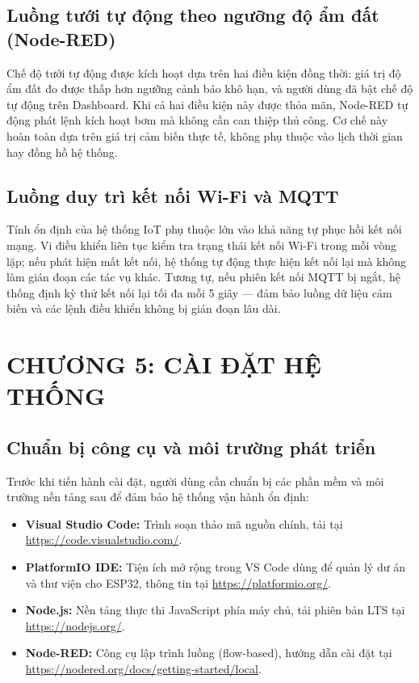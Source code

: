 \documentclass[12pt, a4paper]{article}
\begin{document}
\subsection{Luồng tưới tự động theo ngưỡng độ ẩm đất (Node-RED)}

Chế độ tưới tự động được kích hoạt dựa trên hai điều kiện đồng thời: giá trị độ ẩm đất đo được thấp hơn ngưỡng cảnh báo khô hạn, và người dùng đã bật chế độ tự động trên Dashboard. Khi cả hai điều kiện này được thỏa mãn, Node-RED tự động phát lệnh kích hoạt bơm mà không cần can thiệp thủ công. Cơ chế này hoàn toàn dựa trên giá trị cảm biến thực tế, không phụ thuộc vào lịch thời gian hay đồng hồ hệ thống.

\subsection{Luồng duy trì kết nối Wi-Fi và MQTT}

Tính ổn định của hệ thống IoT phụ thuộc lớn vào khả năng tự phục hồi kết nối mạng. Vi điều khiển liên tục kiểm tra trạng thái kết nối Wi-Fi trong mỗi vòng lặp; nếu phát hiện mất kết nối, hệ thống tự động thực hiện kết nối lại mà không làm gián đoạn các tác vụ khác. Tương tự, nếu phiên kết nối MQTT bị ngắt, hệ thống định kỳ thử kết nối lại tối đa mỗi 5 giây — đảm bảo luồng dữ liệu cảm biến và các lệnh điều khiển không bị gián đoạn lâu dài.


\section*{CHƯƠNG 5: CÀI ĐẶT HỆ THỐNG}
{}
\label{sec:ch5}
\setcounter{section}{5}
\setcounter{subsection}{0}

\subsection{Chuẩn bị công cụ và môi trường phát triển}

Trước khi tiến hành cài đặt, người dùng cần chuẩn bị các phần mềm và môi trường nền tảng sau để đảm bảo hệ thống vận hành ổn định:
\begin{itemize}
    \item \textbf{Visual Studio Code:} Trình soạn thảo mã nguồn chính, tải tại \url{https://code.visualstudio.com/}.
    \item \textbf{PlatformIO IDE:} Tiện ích mở rộng trong VS Code dùng để quản lý dư án và thư viện cho ESP32, thông tin tại \url{https://platformio.org/}.
    \item \textbf{Node.js:} Nền tảng thực thi JavaScript phía máy chủ, tải phiên bản LTS tại \url{https://nodejs.org/}.
    \item \textbf{Node-RED:} Công cụ lập trình luồng (flow-based), hướng dẫn cài đặt tại \url{https://nodered.org/docs/getting-started/local}.
\end{itemize}
\end{document}
